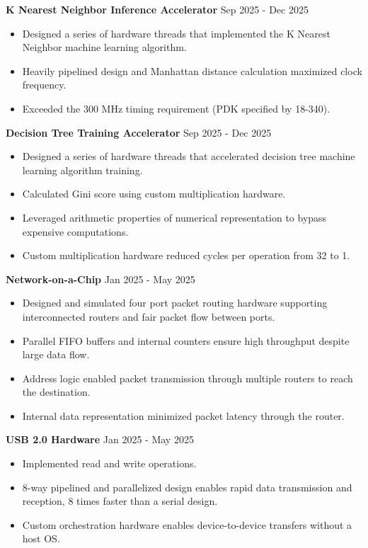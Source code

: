 \documentclass[10pt,letterpaper]{article}
\newcommand{\tightlist}{%
  \setlength{\itemsep}{0pt}%
  \setlength{\leftmargin}{1.0em}%
  \setlength{\parskip}{0pt}%
  \setlength{\topsep}{1.5pt}%
  \setlength{\parsep}{0pt}%
}
\newlength{\cvkeepskip}
\newcommand{\cvkeep}[1]{%
  \begingroup
    \setlength{\cvkeepskip}{#1}%
    \ifdim\pagegoal<\maxdimen
      \addtolength{\cvkeepskip}{\pagetotal}%
      \ifdim\cvkeepskip>\pagegoal
        \newpage
      \fi
    \fi
  \endgroup
}
\newcommand{\entrysep}{\vspace{2pt}\cvkeep{140pt}}
\newcommand{\cvwhen}[1]{\textsf{#1}}%
\begin{document}
\entrysep
\textbf{K Nearest Neighbor Inference Accelerator} \hfill
\cvwhen{Sep 2025 - Dec 2025}
\begin{itemize}\tightlist
  \item Designed a series of hardware threads that implemented the K Nearest
    Neighbor machine learning algorithm.
  \item Heavily pipelined design and Manhattan distance calculation maximized
    clock frequency.
  \item Exceeded the 300 MHz timing requirement (PDK specified by 18-340).
\end{itemize}

\entrysep
\textbf{Decision Tree Training Accelerator} \hfill \cvwhen{Sep 2025 - Dec 2025}
\begin{itemize}\tightlist
  \item Designed a series of hardware threads that accelerated decision tree
    machine learning algorithm training.
  \item Calculated Gini score using custom multiplication hardware.
  \item Leveraged arithmetic properties of numerical representation to bypass
    expensive computations.
  \item Custom multiplication hardware reduced cycles per operation from 32
    to 1.
\end{itemize}

\entrysep
\textbf{Network-on-a-Chip} \hfill \cvwhen{Jan 2025 - May 2025}
\begin{itemize}\tightlist
  \item Designed and simulated four port packet routing hardware supporting
    interconnected routers and fair packet flow between ports.
  \item Parallel FIFO buffers and internal counters ensure high throughput
    despite large data flow.
  \item Address logic enabled packet transmission through multiple routers to
    reach the destination.
  \item Internal data representation minimized packet latency through the
    router.
\end{itemize}

\entrysep
\textbf{USB 2.0 Hardware} \hfill \cvwhen{Jan 2025 - May 2025}
\begin{itemize}\tightlist
  \item Implemented read and write operations.
  \item 8-way pipelined and parallelized design enables rapid data transmission
    and reception, 8 times faster than a serial design.
  \item Custom orchestration hardware enables device-to-device transfers
    without a host OS.
\end{itemize}
\end{document}
